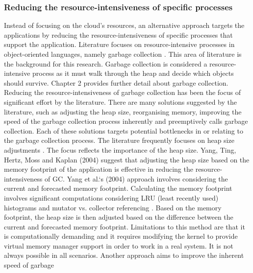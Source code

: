 \subsubsection{Reducing the resource-intensiveness of specific processes}
Instead of focusing on the cloud's resources, an alternative approach
targets the applications by reducing the resource-intensiveness of
specific processes that support the application. Literature focuses on
resource-intensive processes in object-oriented languages, namely
garbage collection \cite{patros2018resource}. This area of literature is the
background for this research.
\newline\newline
Garbage collection is considered a resource-intensive process \cite{amaral2018performance} as it must walk through the heap and decide which
objects should survive. Chapter 2 provides further detail about garbage
collection. Reducing the resource-intensiveness of garbage collection
has been the focus of significant effort by the literature. There are
many solutions suggested by the literature, such as adjusting the heap
size, reorganising memory, improving the speed of the garbage collection
process inherently and preemptively calls garbage collection. Each of
these solutions targets potential bottlenecks in or relating to the
garbage collection process.
\newline\newline
The literature frequently focuses on heap size adjustments \cite{spinner2015proactive}. The focus reflects the importance of the heap size. Yang,
Ting, Hertz, Moss and Kaplan (2004) suggest that adjusting the heap size
based on the memory footprint of the application is effective in
reducing the resource-intensiveness of GC. Yang et al.`s (2004)
approach involves considering the current and forecasted memory
footprint. Calculating the memory footprint involves significant
computations considering LRU (least recently used) histograms and
mutator vs. collector referencing \cite{yang2004automatic}. Based on the memory footprint, the
heap size is then adjusted based on the difference between the current
and forecasted memory footprint. Limitations to this method are that it
is computationally demanding and it requires modifying the kernel to
provide virtual memory manager support in order to work in a real
system. It is not always possible in all scenarios.
\newline\newline
Another approach aims to improve the inherent speed of garbage
